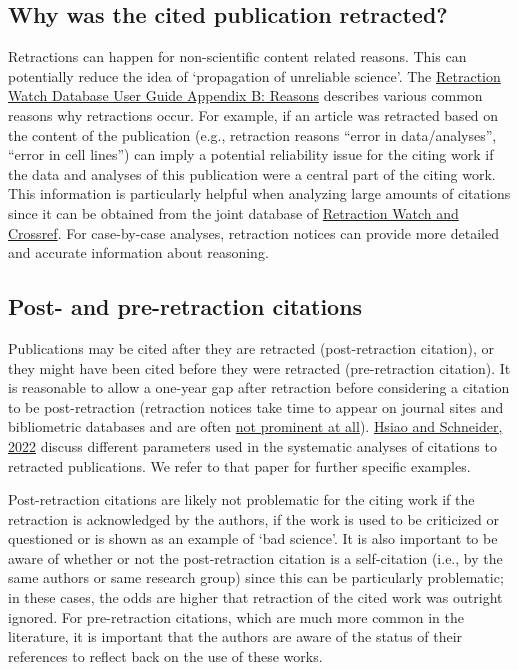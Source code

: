 \documentclass[letterpaper, 12pt]{article}
\begin{document}
\subsection*{Why was the cited publication retracted?} 

Retractions can happen for non-scientific content related reasons. This can potentially reduce the idea of ‘propagation of unreliable science’. The \href{https://retractionwatch.com/retraction-watch-database-user-guide/retraction-watch-database-user-guide-appendix-b-reasons/}{Retraction Watch Database User Guide Appendix B: Reasons} describes various common reasons why retractions occur. For example, if an article was retracted based on the content of the publication (e.g., retraction reasons ``error in data/analyses'', ``error in cell lines'') can imply a potential reliability issue for the citing work if the data and analyses of this publication were a central part of the citing work. This information is particularly helpful when analyzing large amounts of citations since it can be obtained from the joint database of \href{https://gitlab.com/crossref/retraction-watch-data}{Retraction Watch and Crossref}. For case-by-case analyses, retraction notices can provide more detailed and accurate information about reasoning. 

\subsection*{Post- and pre-retraction citations}

Publications may be cited after they are retracted (post-retraction citation), or they might have been cited before they were retracted (pre-retraction citation). 
It is reasonable to allow a one-year gap after retraction before considering a citation to be post-retraction (retraction notices take time to appear on journal sites and bibliometric databases and are often \href{https://retractionwatch.com/2024/07/05/how-you-can-help-improve-the-visibility-of-retractions-introducing-nisos-recommended-practice-for-communication-of-retractions-removals-and-expressions-of-concern-crec/}{not prominent at all}). \href{ https://doi.org/10.1162/qss_a_00155}{Hsiao and Schneider, 2022} discuss different parameters used in the systematic analyses of citations to retracted publications. We refer to that paper for further specific examples.  

Post-retraction citations are likely not problematic for the citing work if the retraction is acknowledged by the authors, if the work is used to be criticized or questioned or is shown as an example of `bad science'. It is also important to be aware of whether or not the post-retraction citation is a self-citation (i.e., by the same authors or same research group) since this can be particularly problematic; in these cases, the odds are higher that retraction of the cited work was outright ignored. For pre-retraction citations, which are much more common in the literature, it is important that the authors are aware of the status of their references to reflect back on the use of these works. 
\end{document}
